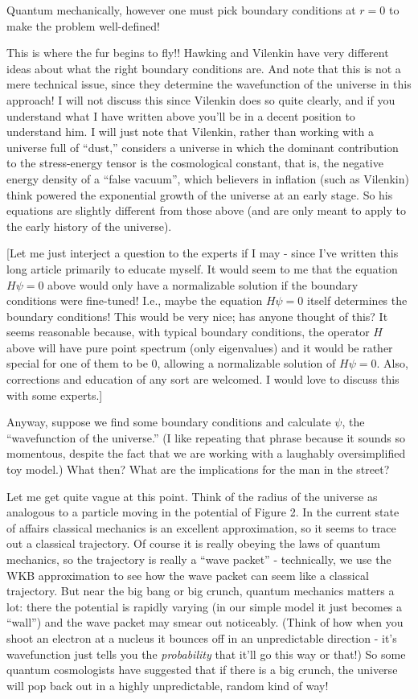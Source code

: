 \documentclass{article}
\begin{document}
Quantum mechanically, however one must pick boundary conditions at
\(r = 0\) to make the problem well-defined!

This is where the fur begins to fly!! Hawking and Vilenkin have very
different ideas about what the right boundary conditions are. And note
that this is not a mere technical issue, since they determine the
wavefunction of the universe in this approach! I will not discuss this
since Vilenkin does so quite clearly, and if you understand what I have
written above you'll be in a decent position to understand him. I will
just note that Vilenkin, rather than working with a universe full of
``dust,'' considers a universe in which the dominant contribution to the
stress-energy tensor is the cosmological constant, that is, the negative
energy density of a ``false vacuum'', which believers in inflation (such
as Vilenkin) think powered the exponential growth of the universe at an
early stage. So his equations are slightly different from those above
(and are only meant to apply to the early history of the universe).

{[}Let me just interject a question to the experts if I may - since I've
written this long article primarily to educate myself. It would seem to
me that the equation \(H \psi = 0\) above would only have a normalizable
solution if the boundary conditions were fine-tuned! I.e., maybe the
equation \(H \psi = 0\) itself determines the boundary conditions! This
would be very nice; has anyone thought of this? It seems reasonable
because, with typical boundary conditions, the operator \(H\) above will
have pure point spectrum (only eigenvalues) and it would be rather
special for one of them to be \(0\), allowing a normalizable solution of
\(H \psi = 0\). Also, corrections and education of any sort are
welcomed. I would love to discuss this with some experts.{]}

Anyway, suppose we find some boundary conditions and calculate \(\psi\),
the ``wavefunction of the universe.'' (I like repeating that phrase
because it sounds so momentous, despite the fact that we are working
with a laughably oversimplified toy model.) What then? What are the
implications for the man in the street?

Let me get quite vague at this point. Think of the radius of the
universe as analogous to a particle moving in the potential of Figure 2.
In the current state of affairs classical mechanics is an excellent
approximation, so it seems to trace out a classical trajectory. Of
course it is really obeying the laws of quantum mechanics, so the
trajectory is really a ``wave packet'' - technically, we use the WKB
approximation to see how the wave packet can seem like a classical
trajectory. But near the big bang or big crunch, quantum mechanics
matters a lot: there the potential is rapidly varying (in our simple
model it just becomes a ``wall'') and the wave packet may smear out
noticeably. (Think of how when you shoot an electron at a nucleus it
bounces off in an unpredictable direction - it's wavefunction just tells
you the \emph{probability} that it'll go this way or that!) So some
quantum cosmologists have suggested that if there is a big crunch, the
universe will pop back out in a highly unpredictable, random kind of
way!
\end{document}
